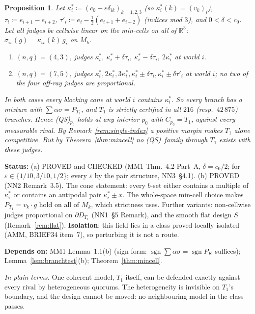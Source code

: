 \documentclass[11pt]{article}
\newtheorem{proposition}[theorem]{Proposition}
\theoremstyle{definition}
\theoremstyle{remark}
\newcommand{\R}{\mathbb R}
\newcommand{\src}[1]{\textsf{#1}}
\newcommand{\status}[1]{\par\smallskip\noindent\textbf{Status:} #1\par}
\newcommand{\deps}[1]{\noindent\textbf{Depends on:} #1\par}
\newcommand{\inwords}[1]{\noindent\textit{In plain terms.} #1\par\smallskip}
\newcommand{\QS}{\textup{(QS)}}
\begin{document}
\begin{proposition}\label{prop:t1only}
Let $\kappa^*_i\coloneqq(c_0+\varepsilon\delta_{ik})_{k=1,2,3}$ (so $\kappa^*_i(k)=(v_k)_i$), $\tau_i\coloneqq e_{i+1}-e_{i+2}$, $\tau'_i\coloneqq e_i-\frac12(e_{i+1}+e_{i+2})$ (indices mod $3$), and $0<\delta<c_0$. Let all judges be cellwise linear on the min-cells on all of $\R^3$: $\sigma_{iv}(g)=\kappa_{iv}(k)\,g_i$ on $M_k$.
\begin{enumerate}[label=(\alph*)]
\item $(n,q)=(4,3)$, judges $\kappa^*_i,\ \kappa^*_i+\delta\tau_i,\ \kappa^*_i-\delta\tau_i,\ 2\kappa^*_i$ at world $i$.
\item $(n,q)=(7,5)$, judges $\kappa^*_i,2\kappa^*_i,3\kappa^*_i,\kappa^*_i\pm\delta\tau_i,\kappa^*_i\pm\delta\tau'_i$ at world $i$; no two of the four off-ray judges are proportional.
\end{enumerate}
In both cases every blocking cone at world $i$ contains $\kappa^*_i$. So every branch has a mixture with $\sum\alpha\sigma=P_{T_1}$, and $T_1$ is \emph{strictly} certified in all $216$ (resp.\ $42\,875$) branches. Hence \QS$_{p_0}$ holds at any interior $p_0$ with $C_{p_0}=T_1$, against every measurable rival. By Remark~\ref{rem:single-index} a positive margin makes $T_1$ alone competitive. But by Theorem~\ref{thm:mincell} no \QS\ family through $T_1$ exists with these judges.
\end{proposition}
\status{(a) PROVED and CHECKED (\src{MM1} Thm.~4.2 Part~A, $\delta=c_0/2$; \file{mm1py/mincell_check.out} for $\varepsilon\in\{1/10,3/10,1/2\}$; every $\varepsilon$ by the pair structure, \src{NN3}~\S4.1). (b) PROVED (\src{NN2} Remark~3.5). The cone statement: every $b$-set either contains a multiple of $\kappa^*_i$ or contains an antipodal pair $\kappa^*_i\pm x$. The whole-space min-cell choice makes $P_{T_1}=v_k\cdot g$ hold on all of $M_k$, which strictness uses. Further variants: non-cellwise judges proportional on $\partial D_{T_1}$ (\src{NN1}~\S5 Remark), and the smooth flat design $S$ (Remark~\ref{rem:flat}). \textbf{Isolation}: this field lies in a class proved locally isolated (\src{AMM}, \src{BRIEF34} item~7), so perturbing it is not a route.}
\deps{\src{MM1} Lemma~1.1(b) (sign form: $\operatorname{sgn}\sum\alpha\sigma=\operatorname{sgn}P_K$ suffices); Lemma~\ref{lem:branchtest}(b); Theorem~\ref{thm:mincell}.}
\inwords{One coherent model, $T_1$ itself, can be defended exactly against every rival by heterogeneous quorums. The heterogeneity is invisible on $T_1$'s boundary, and the design cannot be moved: no neighbouring model in the class passes.}
\end{document}
